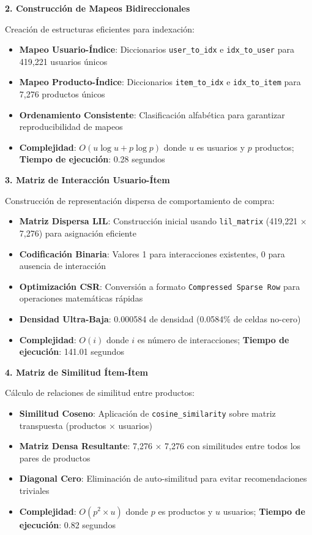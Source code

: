 \documentclass[twocolumn]{article}
\begin{document}
\textbf{2. Construcción de Mapeos Bidireccionales}

Creación de estructuras eficientes para indexación:

\begin{itemize}
    \item \textbf{Mapeo Usuario-Índice}: Diccionarios \texttt{user\_to\_idx} e \texttt{idx\_to\_user} para 419,221 usuarios únicos
    \item \textbf{Mapeo Producto-Índice}: Diccionarios \texttt{item\_to\_idx} e \texttt{idx\_to\_item} para 7,276 productos únicos
    \item \textbf{Ordenamiento Consistente}: Clasificación alfabética para garantizar reproducibilidad de mapeos
    \item \textbf{Complejidad}: \(O(u \log u + p \log p)\) donde \(u\) es usuarios y \(p\) productos; \textbf{Tiempo de ejecución}: 0.28 segundos
\end{itemize}

\textbf{3. Matriz de Interacción Usuario-Ítem}

Construcción de representación dispersa de comportamiento de compra:

\begin{itemize}
    \item \textbf{Matriz Dispersa LIL}: Construcción inicial usando \texttt{lil\_matrix} (419,221 × 7,276) para asignación eficiente
    \item \textbf{Codificación Binaria}: Valores 1 para interacciones existentes, 0 para ausencia de interacción
    \item \textbf{Optimización CSR}: Conversión a formato \texttt{Compressed Sparse Row} para operaciones matemáticas rápidas
    \item \textbf{Densidad Ultra-Baja}: 0.000584 de densidad (0.0584\% de celdas no-cero)
    \item \textbf{Complejidad}: \(O(i)\) donde \(i\) es número de interacciones; \textbf{Tiempo de ejecución}: 141.01 segundos
\end{itemize}

\textbf{4. Matriz de Similitud Ítem-Ítem}

Cálculo de relaciones de similitud entre productos:

\begin{itemize}
    \item \textbf{Similitud Coseno}: Aplicación de \texttt{cosine\_similarity} sobre matriz transpuesta (productos × usuarios)
    \item \textbf{Matriz Densa Resultante}: 7,276 × 7,276 con similitudes entre todos los pares de productos
    \item \textbf{Diagonal Cero}: Eliminación de auto-similitud para evitar recomendaciones triviales
    \item \textbf{Complejidad}: \(O(p^2 \times u)\) donde \(p\) es productos y \(u\) usuarios; \textbf{Tiempo de ejecución}: 0.82 segundos
\end{itemize}
\end{document}
